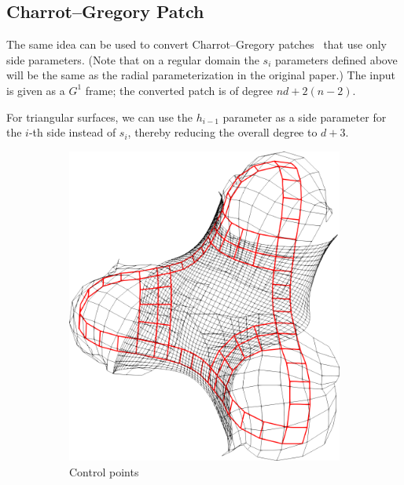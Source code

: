 \documentclass[9pt,academicons]{article}
\begin{document}
\subsection{Charrot--Gregory Patch}
The same idea can be used to convert Charrot--Gregory patches~\cite{Charrot:1984} that use
only side parameters. (Note that on a regular domain the $s_i$ parameters defined above
will be the same as the radial parameterization in the original paper.)
The input is given as a $G^1$ frame; the converted patch is of degree $nd+2(n-2)$.

For triangular surfaces, we can use the $h_{i-1}$ parameter as a side parameter for the $i$-th
side instead of $s_i$, thereby reducing the overall degree to $d+3$.
\begin{figure}[h!]
  \begin{subfigure}{.24\textwidth}
    \centering
    \includegraphics[height=.2\textheight]{images/trebol3-cnet.png}
    \caption{Control points}
    \label{fig:trebol-cnet}
  \end{subfigure}
  \hfill
  \begin{subfigure}{.24\textwidth}
    \centering

\end{subfigure}
\end{figure}
\end{document}
